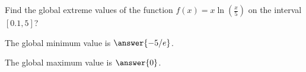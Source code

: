 \documentclass{ximera}
\begin{document}
\begin{exercise}

Find the global extreme values of the function $f(x) = x \ln\left( \frac{x}{5} \right)$ on the interval
$[0.1, 5]$?


The global minimum value is $\answer{-5/e}$.

The global maximum value is $\answer{0}$.

\end{exercise}
\end{document}

